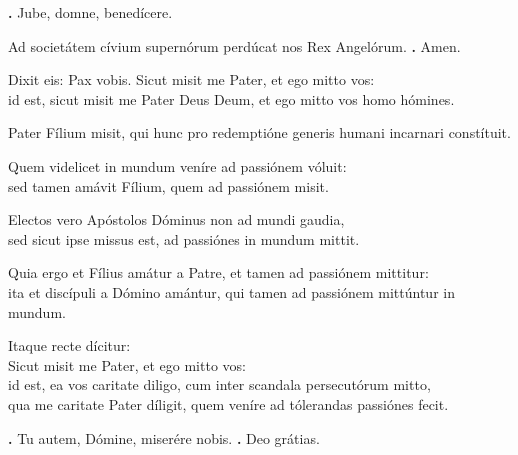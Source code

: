 \begin{small}
\textbf{\Vbar.} Jube, domne, benedícere.

Ad societátem cívium supernórum perdúcat nos Rex Angelórum. \textbf{\Rbar.} Amen.
\end{small}


Dixit eis: Pax vobis. Sicut misit me Pater, et ego mitto vos: \\
id est, sicut misit me Pater Deus Deum, et ego mitto vos homo hómines. 

Pater Fílium misit, qui hunc pro redemptióne generis humani incarnari constítuit. 

Quem videlicet in mundum veníre ad passiónem vóluit: \\
sed tamen amávit Fílium, quem ad passiónem misit. 

Electos vero Apóstolos Dóminus non ad mundi gaudia, \\
sed sicut ipse missus est, ad passiónes in mundum mittit. 

Quia ergo et Fílius amátur a Patre, et tamen ad passiónem mittitur: \\
ita et discípuli a Dómino amántur, qui tamen ad passiónem mittúntur in mundum. 

Itaque recte dícitur: \\
Sicut misit me Pater, et ego mitto vos: \\
id est, ea vos caritate diligo, cum inter scandala persecutórum mitto, \\
qua me caritate Pater díligit, quem veníre ad tólerandas passiónes fecit.

\textbf{\Vbar.} Tu autem, Dómine, miserére nobis.
\textbf{\Rbar.} Deo grátias.


